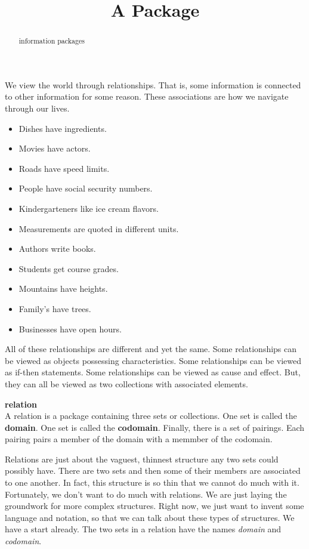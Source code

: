 \documentclass{ximera}
\title{A Package}
\begin{document}
\begin{abstract}
information packages
\end{abstract}
\maketitle


We view the world through relationships. That is, some information is connected to other information for some reason. These associations are how we navigate through our lives.

\begin{itemize}
\item Dishes have ingredients.
\item Movies have actors.
\item Roads have speed limits.
\item People have social security numbers.
\item Kindergarteners like ice cream flavors.
\item Measurements are quoted in different units.
\item Authors write books.
\item Students get course grades.
\item Mountains have heights.
\item Family's have trees.
\item Businesses have open hours.
\end{itemize}


All of these relationships are different and yet the same.  Some relationships can be viewed as objects possessing characteristics. Some relationships can be viewed as if-then statements.  Some relationships can be viewed as cause and effect. But, they can all be viewed as two collections with associated elements.







\begin{definition} \textbf{relation} \\
A relation is a package containing three sets or collections. One set is called the \textbf{domain}. One set is called the \textbf{codomain}.  Finally, there is a set of pairings.  Each pairing pairs a member of the domain with a memmber of the codomain.
\end{definition}


Relations are just about the vaguest, thinnest structure any two sets could possibly have. There are two sets and then some of their members are associated to one another. In fact, this structure is so thin that we cannot do much with it.  Fortunately, we don't want to do much with relations.  We are just laying the groundwork for more complex structures.  Right now, we just want to invent some language and notation, so that we can talk about these types of structures. We have a start already. The two sets in a relation have the names \textit{domain} and \textit{codomain}.
\end{document}
